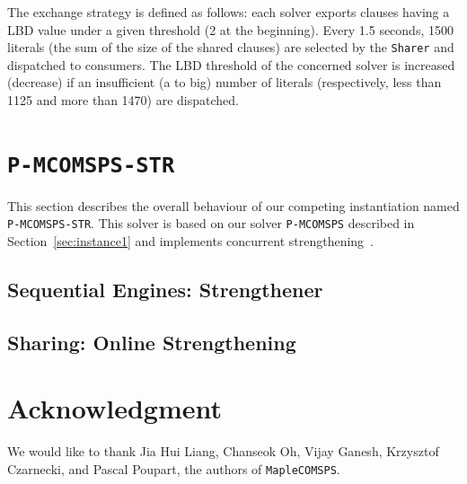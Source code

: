 \documentclass[conference]{IEEEtran}
\newcommand{\maple}[0]{\texttt{MapleCOMSPS}\xspace}
\newcommand{\pmcomsps}[0]{\texttt{P-MCOMSPS}\xspace}
\newcommand{\preduce}[0]{\texttt{P-MCOMSPS-STR}\xspace}
\begin{document}
The exchange strategy is  defined  as follows: each solver exports clauses
having a LBD value under a given threshold (2 at the beginning). Every 1.5
seconds, 1500 literals (the sum of the size of the shared clauses) are selected
by the \texttt{Sharer} and dispatched to consumers. The LBD threshold of the
concerned solver is increased (decrease) if an insufficient (a to big) number
of literals (respectively, less than 1125 and more than 1470) are dispatched.

\section{\preduce}
\label{sec:instance2}

This section describes the overall behaviour of our competing instantiation
named \preduce. This solver is based on our solver \pmcomsps described in
Section~\ref{sec:instance1} and implements concurrent strengthening~\cite{}.

\subsection{Sequential Engines: Strengthener}

\subsection{Sharing: Online Strengthening}

\section*{Acknowledgment}

We would like to thank Jia Hui Liang, Chanseok Oh, Vijay Ganesh, Krzysztof
Czarnecki, and Pascal Poupart, the authors of \maple.



\end{document}
